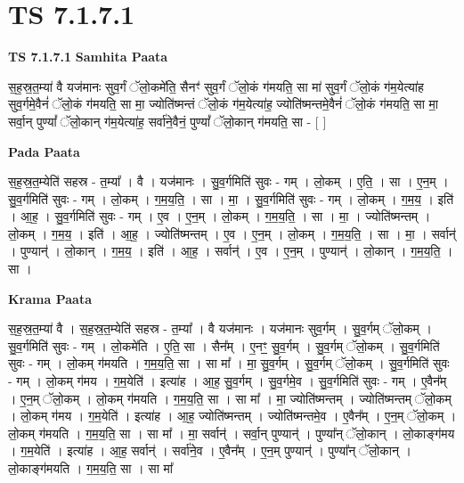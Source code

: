 \documentclass[17pt]{extarticle}
\begin{document}
\section{ TS 7.1.7.1 }

\textbf{TS 7.1.7.1 } \newline
\textbf{Samhita Paata} \newline

स॒ह॒स्र॒त॒म्या॑ वै यज॑मानः सुव॒र्गं ॅलो॒कमे॑ति॒ सैनꣳ॑ सुव॒र्गं ॅलो॒कं ग॑मयति॒ सा मा॑ सुव॒र्गं ॅलो॒कं ग॑म॒येत्या॑ह सुव॒र्गमे॒वैनं॑ ॅलो॒कं ग॑मयति॒ सा मा॒ ज्योति॑ष्मन्तं ॅलो॒कं ग॑म॒येत्या॑ह॒ ज्योति॑ष्मन्तमे॒वैनं॑ ॅलो॒कं ग॑मयति॒ सा मा॒ सर्वा॒न् पुण्यां᳚ ॅलो॒कान् ग॑म॒येत्या॑ह॒ सर्वा॑ने॒वैनं॒ पुण्यां᳚ ॅलो॒कान् ग॑मयति॒ सा - [  ] \newline

\textbf{Pada Paata} \newline

स॒ह॒स्र॒त॒म्येति॑ सहस्र - त॒म्या᳚ । वै । यज॑मानः । सु॒व॒र्गमिति॑ सुवः - गम् । लो॒कम् । ए॒ति॒ । सा । ए॒न॒म् । सु॒व॒र्गमिति॑ सुवः - गम् । लो॒कम् । ग॒म॒य॒ति॒ । सा । मा॒ । सु॒व॒र्गमिति॑ सुवः - गम् । लो॒कम् । ग॒म॒य॒ । इति॑ । आ॒ह॒ । सु॒व॒र्गमिति॑ सुवः - गम् । ए॒व । ए॒न॒म् । लो॒कम् । ग॒म॒य॒ति॒ । सा । मा॒ । ज्योति॑ष्मन्तम् । लो॒कम् । ग॒म॒य॒ । इति॑ । आ॒ह॒ । ज्योति॑ष्मन्तम् । ए॒व । ए॒न॒म् । लो॒कम् । ग॒म॒य॒ति॒ । सा । मा॒ । सर्वान्॑ । पुण्यान्॑ । लो॒कान् । ग॒म॒य॒ । इति॑ । आ॒ह॒ । सर्वान्॑ । ए॒व । ए॒न॒म् । पुण्यान्॑ । लो॒कान् । ग॒म॒य॒ति॒ । सा ।  \newline


\textbf{Krama Paata} \newline

स॒ह॒स्र॒त॒म्या॑ वै । स॒ह॒स्र॒त॒म्येति॑ सहस्र - त॒म्या᳚ । वै यज॑मानः । यज॑मानः सुव॒र्गम् । सु॒व॒र्गम् ॅलो॒कम् । सु॒व॒र्गमिति॑ सुवः - गम् । लो॒कमे॑ति । ए॒ति॒ सा । सैन᳚म् । ए॒नꣳ॒॒ सु॒व॒र्गम् । सु॒व॒र्गम् ॅलो॒कम् । सु॒व॒र्गमिति॑ सुवः - गम् । लो॒कम् ग॑मयति । ग॒म॒य॒ति॒ सा । सा मा᳚ । मा॒ सु॒व॒र्गम् । सु॒व॒र्गम् ॅलो॒कम् । सु॒व॒र्गमिति॑ सुवः - गम् । लो॒कम् ग॑मय । ग॒म॒येति॑ । इत्या॑ह । आ॒ह॒ सु॒व॒र्गम् । सु॒व॒र्गमे॒व । सु॒व॒र्गमिति॑ सुवः - गम् । ए॒वैन᳚म् । ए॒न॒म् ॅलो॒कम् । लो॒कम् ग॑मयति । ग॒म॒य॒ति॒ सा । सा मा᳚ । मा॒ ज्योति॑ष्मन्तम् । ज्योति॑ष्मन्तम् ॅलो॒कम् । लो॒कम् ग॑मय । ग॒म॒येति॑ । इत्या॑ह । आ॒ह॒ ज्योति॑ष्मन्तम् । ज्योति॑ष्मन्तमे॒व । ए॒वैन᳚म् । ए॒न॒म् ॅलो॒कम् । लो॒कम् ग॑मयति । ग॒म॒य॒ति॒ सा । सा मा᳚ । मा॒ सर्वान्॑ । सर्वा॒न् पुण्यान्॑ । पुण्या᳚न् ॅलो॒कान् । लो॒काङ्‍ग॑मय । ग॒म॒येति॑ । इत्या॑ह । आ॒ह॒ सर्वान्॑ । सर्वा॑ने॒व । ए॒वैन᳚म् । ए॒न॒म् पुण्यान्॑ । पुण्या᳚न् ॅलो॒कान् । लो॒काङ्‍ग॑मयति । ग॒म॒य॒ति॒ सा । सा मा᳚ \newline
\end{document}
